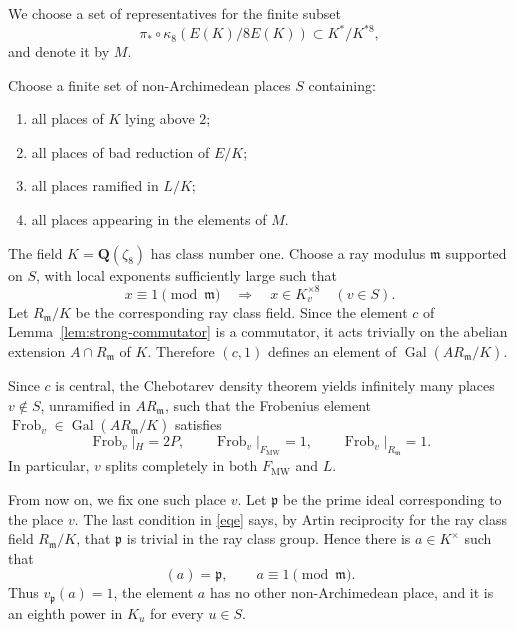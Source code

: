 \documentclass[11pt,a4paper]{amsart}
\theoremstyle{definition}
\newcommand{\Q}{\mathbf Q}
\newcommand{\Gal}{\operatorname{Gal}}
\numberwithin{equation}{section}
\begin{document}
We choose a set of representatives for the finite subset
\[
\pi_*\circ\kappa_8(E(K)/8E(K))
\subset K^*/K^{*8},
\]
and denote it by $M$.

Choose a finite set of non-Archimedean  places $S$ containing:
\begin{enumerate}[label=\textup{(\roman*)}]
	\item all places of $K$ lying above $2$;
	\item all places of bad reduction of $E/K$;
	\item all places ramified in $L/K$;
	\item all places appearing in the elements of $M$.
\end{enumerate}
The field $K=\Q(\zeta_8)$ has class number one. Choose a ray modulus
$\mathfrak m$ supported on $S$, with local exponents sufficiently large such
that
\begin{equation}\label{eq:ray-local-power}
 x\equiv1\pmod{\mathfrak m}
 \quad\Longrightarrow\quad
 x\in K_v^{\times8}
 \quad(v\in S).
\end{equation}
Let $R_{\mathfrak m}/K$ be the corresponding ray class field.  Since the element $c$ of
Lemma~\ref{lem:strong-commutator} is a commutator, it acts trivially on the
abelian extension $ A\cap R_{\mathfrak m}$ of $K$.  Therefore $(c,1)$ defines an element of $\Gal(AR_{\mathfrak m}/K)$.

Since \(c\) is central, the Chebotarev density theorem yields infinitely many
places \(v\notin S\), unramified in \(AR_{\mathfrak m}\), such that the
Frobenius element \(\operatorname{Frob}_v\in \Gal(AR_{\mathfrak m}/K)\)
satisfies
\begin{equation}\label{eqe}
	\operatorname{Frob}_v|_H=2P,
	\qquad
	\operatorname{Frob}_v|_{F_{\mathrm{MW}}}=1,
	\qquad
	\operatorname{Frob}_v|_{R_{\mathfrak m}}=1.
\end{equation}
In particular, \(v\) splits completely in both \(F_{\mathrm{MW}}\) and
\(L\).

 From now on, we fix one such place $v$. Let \(\mathfrak{p}\) be the prime ideal corresponding to the place \(v\). The last condition in \eqref{eqe} says, by Artin reciprocity
for the ray class field $R_{\mathfrak m}/K$, that $\mathfrak p$ is trivial in
the ray class group.  Hence there is
$a\in K^\times$ such that
\begin{equation}\label{eq:ray-generator}
 (a)=\mathfrak p,
 \qquad
 a\equiv1\pmod{\mathfrak m}.
\end{equation}
Thus $v_{\mathfrak p}(a)=1$, the element $a$ has no other non-Archimedean
place, and it is an eighth power in $K_u$ for every $u\in S$.
\end{document}
